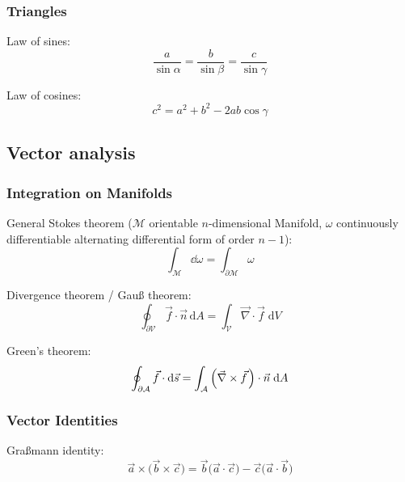 		\subsubsection{Triangles}
			\noindent
			Law of sines:
			\begin{equation}
				\frac{a}{\sin\alpha} = \frac{b}{\sin\beta} = \frac{c}{\sin\gamma}
			\end{equation}

			\noindent
			Law of cosines:
			\begin{equation}
				c^2 = a^2 + b^2 -2ab \cos\gamma
			\end{equation}


	\subsection{Vector analysis}
		\subsubsection{Integration on Manifolds}
			\noindent
			General Stokes theorem ($\mathcal{M}$ orientable $n$-dimensional Manifold, $\omega$ continuously differentiable alternating differential form of order $n-1$):
			\begin{equation}
				\int_\mathcal{M} \dd \omega = \int_{\partial\mathcal{M}} \omega
			\end{equation}

			\noindent
			Divergence theorem / Gauß theorem:
			\begin{equation}
				\oint_{\partial\mathcal{V}}\vec{f}\cdot\vec{n}\,\mathrm{d}A=\int_{\mathcal{V}}\vec{\nabla}\cdot\vec{f}\;\mathrm{d}V
			\end{equation}

			\noindent
			Green's theorem:
			\begin{equation}
				\oint_{\partial\mathcal{A}}\vec{f}\cdot\mathrm{d}\vec{s}=\int_{\mathcal{A}}\left(\vec{\nabla}\times\pvec{f}\right)\cdot\vec{n}\;\mathrm{d}A
			\end{equation}

		\subsubsection{Vector Identities}
			\noindent
			Graßmann identity:
			\begin{equation}
				\vec{a}\times\big(\vec{b}\times\vec{c}\big) = \vec{b}\big(\vec{a}\cdot\vec{c}\big) - \vec{c}\big(\vec{a}\cdot\vec{b}\big)
			\end{equation}


